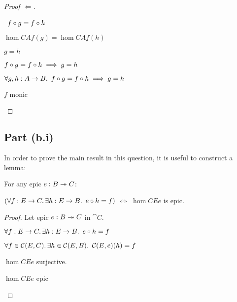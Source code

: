 \begin{prop}
\begin{proof}[Proof $\Leftarrow$]
\begin{itemize}
\begin{itemize}
          \step
            \begin{itemize}
            \subp{\dagger}
              \Ass~$f\compose g = f\compose h$
              \marginnote{\Hyp}

            \step[\iffs] $\hom{C}{A}{f}(g) = \hom{C}{A}{f}(h)$
              \marginnote{\Def-\ref{def:co-hom}}

            \step[\imps] $g = h$
            \end{itemize}

          \step[\imps] $f\compose g = f\compose h \implies g = h$
            \marginnote{$\imps$-\Intro}
        \end{itemize}
      \step[\imps] $\forall g, h : A \to B\ldotp~f\compose g = f\compose h \implies g = h$
        \marginnote{$\forall$-\Intro}

      \step[\iffs] $f$ monic
        \qedhere
    \end{itemize}
  \end{proof}
\end{prop}

\subsection{Part (b.i)}\label{sec:q-1-b-i}

In order to prove the main result in this question, it is useful to construct a lemma:

\begin{lemma}\label{lemma:epic-preserve-1}
  For any epic $e : B \epic C$:

  $(\forall f : E\to C\ldotp\exists h : E\to B\ldotp~e\compose h = f)$
  $\iff$ $\hom{C}{E}{e}$ is epic.

  \begin{proof}
    Let epic $e : B \epic C$ in $\cat{C}$.
    \begin{itemize}
      \step $\forall f : E\to C\ldotp\exists h : E\to B\ldotp~e\compose h = f$
        \marginnote{\Hyp}
      \step[\iffs]

    $\forall f \in\hom{C}{E}{C}\ldotp\exists h\in\hom{C}{E}{B}\ldotp~\hom{C}{E}{e}(h) = f$
        \marginnote{\Def~\ref{def:hom-set}}

      \step[\iffs]
        $\hom{C}{E}{e}$ surjective.

      \step[\iffs]
        $\hom{C}{E}{e}$ epic
        \qedhere

    \end{itemize}
  \end{proof}
\end{lemma}

